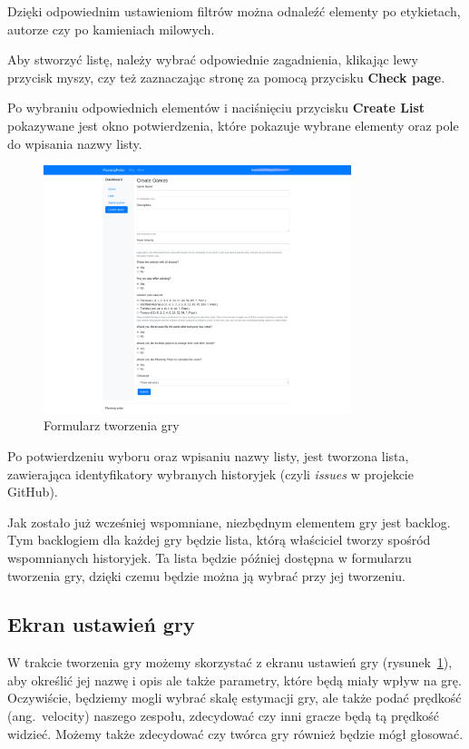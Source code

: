 Dzięki odpowiednim ustawieniom filtrów można odnaleźć elementy po etykietach,
autorze czy po kamieniach milowych.

Aby stworzyć listę, należy wybrać odpowiednie zagadnienia, klikając lewy przycisk myszy,
czy też zaznaczając stronę za pomocą przycisku \textbf{Check page}.

Po wybraniu odpowiednich elementów i naciśnięciu przycisku \textbf{Create List}
pokazywane jest okno potwierdzenia,
które pokazuje wybrane elementy oraz pole do wpisania nazwy listy.

\begin{figure}[h]
	\centering\includegraphics[width=0.8\textwidth]{img/formularz.png}
	\caption{Formularz tworzenia gry}\label{rys:form}%
\end{figure}

Po potwierdzeniu wyboru oraz wpisaniu nazwy listy, jest tworzona lista, zawierająca
identyfikatory wybranych historyjek (czyli \textit{issues} w projekcie GitHub).

Jak zostało już wcześniej wspomniane, niezbędnym elementem gry jest backlog.
Tym backlogiem dla każdej gry będzie lista, którą właściciel tworzy spośród wspomnianych historyjek.
Ta lista będzie później dostępna w formularzu tworzenia gry,
dzięki czemu będzie można ją wybrać przy jej tworzeniu.


\subsection{Ekran ustawień gry}

W trakcie tworzenia gry możemy skorzystać z ekranu ustawień gry (rysunek~\ref{rys:form}),
aby określić jej nazwę i opis ale także parametry, które będą miały wpływ na grę.
Oczywiście, będziemy mogli wybrać skalę estymacji gry, ale także podać prędkość (ang.\ velocity)
naszego zespołu, zdecydować czy inni gracze będą tą prędkość widzieć.
Możemy także zdecydować czy twórca gry również będzie mógł głosować.

